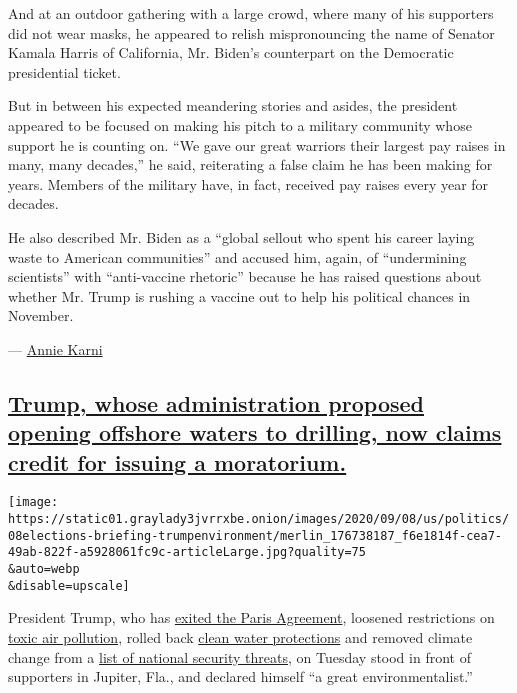 And at an outdoor gathering with a large crowd, where many of his
supporters did not wear masks, he appeared to relish mispronouncing the
name of Senator Kamala Harris of California, Mr. Biden's counterpart on
the Democratic presidential ticket.

But in between his expected meandering stories and asides, the president
appeared to be focused on making his pitch to a military community whose
support he is counting on. ``We gave our great warriors their largest
pay raises in many, many decades,'' he said, reiterating a false claim
he has been making for years. Members of the military have, in fact,
received pay raises every year for decades.

He also described Mr. Biden as a ``global sellout who spent his career
laying waste to American communities'' and accused him, again, of
``undermining scientists'' with ``anti-vaccine rhetoric'' because he has
raised questions about whether Mr. Trump is rushing a vaccine out to
help his political chances in November.

--- \href{https://www.nytimes3xbfgragh.onion/by/annie-karni}{Annie
Karni}

\hypertarget{trump-whose-administration-proposed-opening-offshore-waters-to-drilling-now-claims-credit-for-issuing-a-moratorium}{%
\subsection{\texorpdfstring{\protect\hyperlink{trump-whose-administration-proposed-opening-offshore-waters-to-drilling-now-claims-credit-for-issuing-a-moratorium}{Trump,
whose administration proposed opening offshore waters to drilling, now
claims credit for issuing a
moratorium.}}{Trump, whose administration proposed opening offshore waters to drilling, now claims credit for issuing a moratorium.}}\label{trump-whose-administration-proposed-opening-offshore-waters-to-drilling-now-claims-credit-for-issuing-a-moratorium}}

\texttt{[image: https://static01.graylady3jvrrxbe.onion/images/2020/09/08/us/politics/08elections-briefing-trumpenvironment/merlin\_176738187\_f6e1814f-cea7-49ab-822f-a5928061fc9c-articleLarge.jpg?quality=75\\\&auto=webp\\\&disable=upscale]}

President Trump, who has
\href{https://www.nytimes3xbfgragh.onion/2019/11/04/climate/trump-paris-agreement-climate.html}{exited
the Paris Agreement}, loosened restrictions on
\href{https://www.nytimes3xbfgragh.onion/2020/06/04/climate/trump-environment-coronavirus.html}{toxic
air pollution}, rolled back
\href{https://www.nytimes3xbfgragh.onion/2020/01/22/climate/trump-environment-water.html}{clean
water protections} and removed climate change from a
\href{https://www.nytimes3xbfgragh.onion/2019/07/30/opinion/trump-climate-change.html}{list
of national security threats}, on Tuesday stood in front of supporters
in Jupiter, Fla., and declared himself ``a great environmentalist.''

